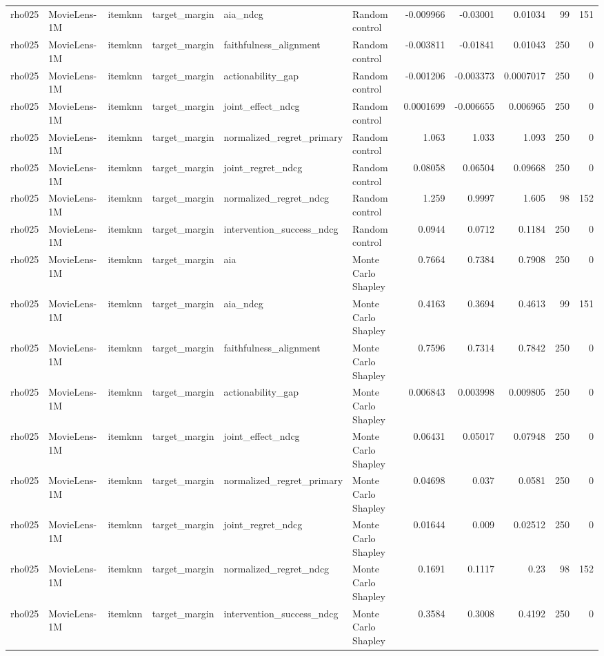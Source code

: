 \begin{table}[t]
{\begin{tabular}{llllllrrrrr}
rho025 & MovieLens-1M & itemknn & target\_margin & aia\_ndcg & Random control & -0.009966 & -0.03001 & 0.01034 & 99 & 151 \\
rho025 & MovieLens-1M & itemknn & target\_margin & faithfulness\_alignment & Random control & -0.003811 & -0.01841 & 0.01043 & 250 & 0 \\
rho025 & MovieLens-1M & itemknn & target\_margin & actionability\_gap & Random control & -0.001206 & -0.003373 & 0.0007017 & 250 & 0 \\
rho025 & MovieLens-1M & itemknn & target\_margin & joint\_effect\_ndcg & Random control & 0.0001699 & -0.006655 & 0.006965 & 250 & 0 \\
rho025 & MovieLens-1M & itemknn & target\_margin & normalized\_regret\_primary & Random control & 1.063 & 1.033 & 1.093 & 250 & 0 \\
rho025 & MovieLens-1M & itemknn & target\_margin & joint\_regret\_ndcg & Random control & 0.08058 & 0.06504 & 0.09668 & 250 & 0 \\
rho025 & MovieLens-1M & itemknn & target\_margin & normalized\_regret\_ndcg & Random control & 1.259 & 0.9997 & 1.605 & 98 & 152 \\
rho025 & MovieLens-1M & itemknn & target\_margin & intervention\_success\_ndcg & Random control & 0.0944 & 0.0712 & 0.1184 & 250 & 0 \\
rho025 & MovieLens-1M & itemknn & target\_margin & aia & Monte Carlo Shapley & 0.7664 & 0.7384 & 0.7908 & 250 & 0 \\
rho025 & MovieLens-1M & itemknn & target\_margin & aia\_ndcg & Monte Carlo Shapley & 0.4163 & 0.3694 & 0.4613 & 99 & 151 \\
rho025 & MovieLens-1M & itemknn & target\_margin & faithfulness\_alignment & Monte Carlo Shapley & 0.7596 & 0.7314 & 0.7842 & 250 & 0 \\
rho025 & MovieLens-1M & itemknn & target\_margin & actionability\_gap & Monte Carlo Shapley & 0.006843 & 0.003998 & 0.009805 & 250 & 0 \\
rho025 & MovieLens-1M & itemknn & target\_margin & joint\_effect\_ndcg & Monte Carlo Shapley & 0.06431 & 0.05017 & 0.07948 & 250 & 0 \\
rho025 & MovieLens-1M & itemknn & target\_margin & normalized\_regret\_primary & Monte Carlo Shapley & 0.04698 & 0.037 & 0.0581 & 250 & 0 \\
rho025 & MovieLens-1M & itemknn & target\_margin & joint\_regret\_ndcg & Monte Carlo Shapley & 0.01644 & 0.009 & 0.02512 & 250 & 0 \\
rho025 & MovieLens-1M & itemknn & target\_margin & normalized\_regret\_ndcg & Monte Carlo Shapley & 0.1691 & 0.1117 & 0.23 & 98 & 152 \\
rho025 & MovieLens-1M & itemknn & target\_margin & intervention\_success\_ndcg & Monte Carlo Shapley & 0.3584 & 0.3008 & 0.4192 & 250 & 0 \\
\bottomrule
\end{tabular}
}
\end{table}
